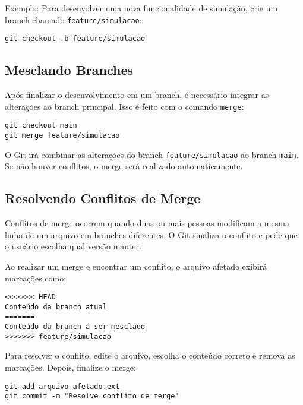 Exemplo: Para desenvolver uma nova funcionalidade de simulação, crie um branch chamado \texttt{feature/simulacao}:

\begin{lstlisting}[style=shellstyle]
git checkout -b feature/simulacao
\end{lstlisting}

\subsection{Mesclando Branches}

Após finalizar o desenvolvimento em um branch, é necessário integrar as alterações ao branch principal. Isso é feito com o comando \texttt{merge}:

\begin{lstlisting}[style=shellstyle]
git checkout main
git merge feature/simulacao
\end{lstlisting}

O Git irá combinar as alterações do branch \texttt{feature/simulacao} ao branch \texttt{main}. Se não houver conflitos, o merge será realizado automaticamente.

\subsection{Resolvendo Conflitos de Merge}

Conflitos de merge ocorrem quando duas ou mais pessoas modificam a mesma linha de um arquivo em branches diferentes. O Git sinaliza o conflito e pede que o usuário escolha qual versão manter.

Ao realizar um merge e encontrar um conflito, o arquivo afetado exibirá marcações como:

\begin{verbatim}
<<<<<<< HEAD
Conteúdo da branch atual
=======
Conteúdo da branch a ser mesclado
>>>>>>> feature/simulacao
\end{verbatim}

Para resolver o conflito, edite o arquivo, escolha o conteúdo correto e remova as marcações. Depois, finalize o merge:

\begin{lstlisting}[style=shellstyle]
git add arquivo-afetado.ext
git commit -m "Resolve conflito de merge"
\end{lstlisting}


